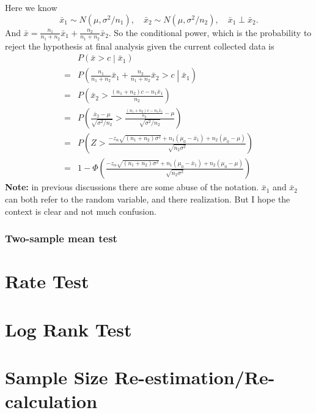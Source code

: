 \documentclass[a4paper,12pt]{article}
\begin{document}
Here we know
\[
  \bar{x}_1 \sim N\left(\mu, \sigma^2 / n_1\right)
  ,\quad
  \bar{x}_2 \sim N\left(\mu, \sigma^2 / n_2\right)
  ,\quad
  \bar{x}_1 \perp \bar{x}_2
  .
\]
And $\bar{x} = \frac{n_1}{n_1 + n_2}\bar{x}_1 + \frac{n_2}{n_1 + n_2}\bar{x}_2$. So the conditional power, which is the probability to reject the hypothesis at final analysis given the current collected data is
\begin{equation}
  \label{eq:cp_normal_sigma_known_one_sample}
  \begin{aligned}
    & P\left(\bar{x} > c \middle| \bar{x}_1\right)    \\
    =& P\left(
      \frac{n_1}{n_1 + n_2}\bar{x}_1 + \frac{n_2}{n_1 + n_2}\bar{x}_2 > c\middle| \bar{x}_1
    \right)    \\
    =& P\left(
      \bar{x}_2 > \frac{\left(n_1 + n_2\right)c - n_1\bar{x}_1}{n_2}
    \right)    \\
    =& P\left(
      \frac{\bar{x}_2 - \mu}{\sqrt{\sigma^2/n_2}}
      > \frac{
        \frac{\left(n_1 + n_2\right)c - n_1\bar{x}_1}{n_2}- \mu
      }{\sqrt{\sigma^2/n_2}}
    \right)    \\
    =& P\left(
      Z > \frac{
        -z_{\alpha}\sqrt{\left(n_1 + n_2\right)\sigma^2}
        + n_1\left(\mu_0 - \bar{x}_1\right)
        + n_2\left(\mu_0 - \mu\right)
      }{\sqrt{n_2\sigma^2}}
    \right)    \\
    =& 1 - \Phi\left(
      \frac{
        -z_{\alpha}\sqrt{\left(n_1 + n_2\right)\sigma^2}
        + n_1\left(\mu_0 - \bar{x}_1\right)
        + n_2\left(\mu_0 - \mu\right)
      }{\sqrt{n_2\sigma^2}}
    \right)
  \end{aligned}
\end{equation}
\textbf{Note:} in previous discussions there are some abuse of the notation. $\bar{x}_1$ and $\bar{x}_2$ can both refer to the random variable, and there realization. But I hope the context is clear and not much confusion.

\subsubsection{Two-sample mean test}
\label{sec:two-sample-mean}



\section{Rate Test}
\label{sec:rate-test}

\section{Log Rank Test}
\label{sec:log-rank-test}

\section{Sample Size Re-estimation/Re-calculation}
\label{sec:sample-size-re}








\clearpage
\appendix
\end{document}
